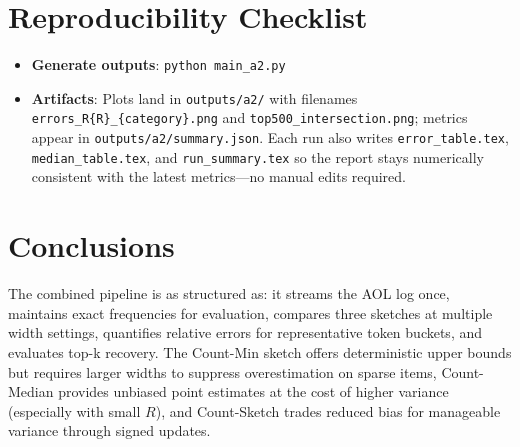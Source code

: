 \documentclass[11pt]{article}
\begin{document}
\section{Reproducibility Checklist}
\begin{itemize}
  \item \textbf{Generate outputs}: \verb|python main_a2.py|\ 
  \item \textbf{Artifacts}: Plots land in \texttt{outputs/a2/} with filenames \texttt{errors\_R\{R\}\_\{category\}.png} and \texttt{top500\_intersection.png}; metrics appear in \texttt{outputs/a2/summary.json}. Each run also writes \texttt{error\_table.tex}, \texttt{median\_table.tex}, and \texttt{run\_summary.tex} so the report stays numerically consistent with the latest metrics—no manual edits required.
\end{itemize}

\section{Conclusions}
The combined pipeline is as structured as: it streams the AOL log once, maintains exact frequencies for evaluation, compares three sketches at multiple width settings, quantifies relative errors for representative token buckets, and evaluates top-k recovery. The Count-Min sketch offers deterministic upper bounds but requires larger widths to suppress overestimation on sparse items, Count-Median provides unbiased point estimates at the cost of higher variance (especially with small $R$), and Count-Sketch trades reduced bias for manageable variance through signed updates. 
\end{document}
